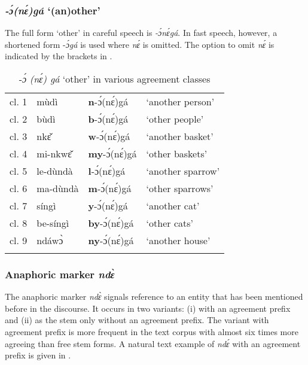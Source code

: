 \largerpage
\subsubsection{{\itshape -ɔ́(nɛ́)gá} `(an)other'}
\label{sec:other}

The full form `other' in careful speech is {\itshape -ɔ́nɛ́gá}. 
In fast speech, however, a shortened form {\AGR}-{\itshape ɔ́gá} is used where {\itshape nɛ́} is omitted. The option to omit {\itshape nɛ́} is indicated by the brackets in .

\begin{table}
\begin{tabularx}{\textwidth}{XXXl}
 \lsptoprule
cl. 1 & mùdì & {\bfseries n}-ɔ́(nɛ́)gá & `another person' \\
cl. 2 & bùdì & {\bfseries b}-ɔ́(nɛ́)gá & `other people' \\
cl. 3 & nkɛ̌ & {\bfseries w}-ɔ́(nɛ́)gá & `another basket' \\
cl. 4 & mi-nkwɛ̌ & {\bfseries my}-ɔ́(nɛ́)gá & `other baskets' \\
cl. 5 & le-dùndà & {\bfseries l}-ɔ́(nɛ́)gá & `another sparrow' \\
cl. 6 & ma-dùndà & {\bfseries m}-ɔ́(nɛ́)gá & `other sparrows' \\
cl. 7 & síngì & {\bfseries y}-ɔ́(nɛ́)gá & `another cat' \\
cl. 8 & be-síngì & {\bfseries by}-ɔ́(nɛ́)gá & `other cats' \\
cl. 9 & ndáwɔ̀ & {\bfseries ny}-ɔ́(nɛ́)gá & `another house' \\
 \lspbottomrule
\end{tabularx}
\caption{{\AGR}-{\itshape ɔ́ (nɛ́) gá} `other' in various agreement classes}
\label{Tab:Other}
\end{table}






\subsubsection{Anaphoric marker {\itshape ndɛ̀}}
\label{sec:ANAfree}

The anaphoric marker {\itshape ndɛ̀} signals reference to an entity that has been mentioned before in the discourse. It occurs in two variants: (i) with an agreement prefix and (ii) as the stem only without an agreement prefix.  The variant with agreement prefix is more frequent in the text corpus with almost six times more agreeing than free stem forms. A natural text example of {\itshape ndɛ́} with an agreement prefix is given in .

